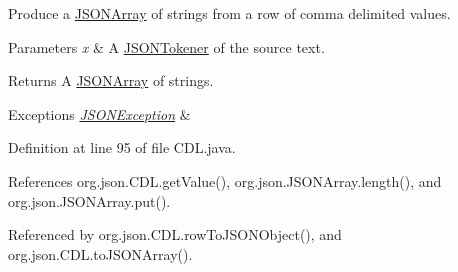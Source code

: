 Produce a \hyperlink{classorg_1_1json_1_1_j_s_o_n_array}{J\-S\-O\-N\-Array} of strings from a row of comma delimited values. 
\begin{DoxyParams}{Parameters}
{\em x} & A \hyperlink{classorg_1_1json_1_1_j_s_o_n_tokener}{J\-S\-O\-N\-Tokener} of the source text. \\
\hline
\end{DoxyParams}
\begin{DoxyReturn}{Returns}
A \hyperlink{classorg_1_1json_1_1_j_s_o_n_array}{J\-S\-O\-N\-Array} of strings. 
\end{DoxyReturn}

\begin{DoxyExceptions}{Exceptions}
{\em \hyperlink{classorg_1_1json_1_1_j_s_o_n_exception}{J\-S\-O\-N\-Exception}} & \\
\hline
\end{DoxyExceptions}


Definition at line 95 of file C\-D\-L.\-java.



References org.\-json.\-C\-D\-L.\-get\-Value(), org.\-json.\-J\-S\-O\-N\-Array.\-length(), and org.\-json.\-J\-S\-O\-N\-Array.\-put().



Referenced by org.\-json.\-C\-D\-L.\-row\-To\-J\-S\-O\-N\-Object(), and org.\-json.\-C\-D\-L.\-to\-J\-S\-O\-N\-Array().


